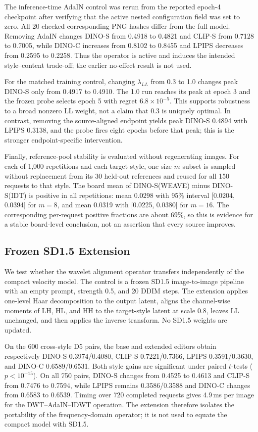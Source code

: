 \documentclass[10pt,twocolumn]{article}
\newcommand{\weave}{WEAVE}
\begin{document}
The inference-time AdaIN control was rerun from the reported epoch-4 checkpoint after
verifying that the active nested configuration field was set to zero. All 20 checked
corresponding PNG hashes differ from the full model. Removing AdaIN changes DINO-S from
0.4918 to 0.4821 and CLIP-S from 0.7128 to 0.7005, while DINO-C increases from 0.8102 to
0.8455 and LPIPS decreases from 0.2595 to 0.2258. Thus the operator is active and induces
the intended style--content trade-off; the earlier no-effect result is not used.

For the matched training control, changing $\lambda_{LL}$ from 0.3 to 1.0 changes peak
DINO-S only from 0.4917 to 0.4910. The 1.0 run reaches its peak at epoch 3 and the frozen
probe selects epoch 5 with regret $6.8\times10^{-5}$. This supports robustness to a broad
nonzero LL weight, not a claim that 0.3 is uniquely optimal. In contrast, removing the
source-aligned endpoint yields peak DINO-S 0.4894 with LPIPS 0.3138, and the probe fires
eight epochs before that peak; this is the stronger endpoint-specific intervention.

Finally, reference-pool stability is evaluated without regenerating images. For each of
1,000 repetitions and each target style, one size-$m$ subset is sampled without replacement
from its 30 held-out references and reused for all 150 requests to that style. The board mean
of DINO-S(\weave{}) minus DINO-S(IDT) is positive in all repetitions: mean 0.0298 with
95\% interval [0.0204, 0.0394] for $m=8$, and mean 0.0319 with [0.0225, 0.0380] for
$m=16$. The corresponding per-request positive fractions are about 69\%, so this is
evidence for a stable board-level conclusion, not an assertion that every source improves.

\subsection{Frozen SD1.5 Extension}

We test whether the wavelet alignment operator transfers independently of the compact
velocity model. The control is a frozen SD1.5 image-to-image pipeline with an empty prompt,
strength 0.5, and 20 DDIM steps. The extension applies one-level Haar decomposition to the
output latent, aligns the channel-wise moments of LH, HL, and HH to the target-style latent
at scale 0.8, leaves LL unchanged, and then applies the inverse transform. No SD1.5 weights
are updated.

On the 600 cross-style D5 pairs, the base and extended editors obtain respectively
DINO-S 0.3974/0.4080, CLIP-S 0.7221/0.7366, LPIPS 0.3591/0.3630, and DINO-C
0.6589/0.6531. Both style gains are significant under paired $t$-tests
($p<10^{-15}$). On all 750 pairs, DINO-S changes from 0.4525 to 0.4613 and CLIP-S
from 0.7476 to 0.7594, while LPIPS remains 0.3586/0.3588 and DINO-C changes from
0.6583 to 0.6539. Timing over 720 completed requests gives 4.9\,ms per image for the
DWT--AdaIN--IDWT operation. The extension therefore isolates the portability of the
frequency-domain operator; it is not used to equate the compact model with SD1.5.
\end{document}
